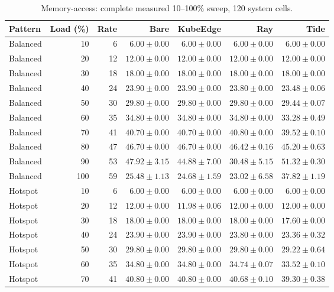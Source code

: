 \begin{table}[htbp]\centering\small
\caption{Memory-access: complete measured 10--100\% sweep, 120 system cells.}
\label{tab:fig6-sweep-memory}
\begin{tabular*}{\linewidth}{@{\extracolsep{\fill}}lrrrrrr}
\toprule Pattern & Load (\%) & Rate & Bare & KubeEdge & Ray & Tide\\\midrule
Balanced & 10 & 6 & $6.00 \pm 0.00$ & $6.00 \pm 0.00$ & $6.00 \pm 0.00$ & $6.00 \pm 0.00$\\
Balanced & 20 & 12 & $12.00 \pm 0.00$ & $12.00 \pm 0.00$ & $12.00 \pm 0.00$ & $12.00 \pm 0.00$\\
Balanced & 30 & 18 & $18.00 \pm 0.00$ & $18.00 \pm 0.00$ & $18.00 \pm 0.00$ & $18.00 \pm 0.00$\\
Balanced & 40 & 24 & $23.90 \pm 0.00$ & $23.90 \pm 0.00$ & $23.80 \pm 0.00$ & $23.48 \pm 0.06$\\
Balanced & 50 & 30 & $29.80 \pm 0.00$ & $29.80 \pm 0.00$ & $29.80 \pm 0.00$ & $29.44 \pm 0.07$\\
Balanced & 60 & 35 & $34.80 \pm 0.00$ & $34.80 \pm 0.00$ & $34.80 \pm 0.00$ & $33.28 \pm 0.49$\\
Balanced & 70 & 41 & $40.70 \pm 0.00$ & $40.70 \pm 0.00$ & $40.80 \pm 0.00$ & $39.52 \pm 0.10$\\
Balanced & 80 & 47 & $46.70 \pm 0.00$ & $46.70 \pm 0.00$ & $46.42 \pm 0.16$ & $45.20 \pm 0.63$\\
Balanced & 90 & 53 & $47.92 \pm 3.15$ & $44.88 \pm 7.00$ & $30.48 \pm 5.15$ & $51.32 \pm 0.30$\\
Balanced & 100 & 59 & $25.48 \pm 1.13$ & $24.68 \pm 1.59$ & $23.02 \pm 6.58$ & $37.82 \pm 1.19$\\
\midrule
Hotspot & 10 & 6 & $6.00 \pm 0.00$ & $6.00 \pm 0.00$ & $6.00 \pm 0.00$ & $6.00 \pm 0.00$\\
Hotspot & 20 & 12 & $12.00 \pm 0.00$ & $11.98 \pm 0.06$ & $12.00 \pm 0.00$ & $12.00 \pm 0.00$\\
Hotspot & 30 & 18 & $18.00 \pm 0.00$ & $18.00 \pm 0.00$ & $18.00 \pm 0.00$ & $17.60 \pm 0.00$\\
Hotspot & 40 & 24 & $23.90 \pm 0.00$ & $23.90 \pm 0.00$ & $23.80 \pm 0.00$ & $23.36 \pm 0.32$\\
Hotspot & 50 & 30 & $29.80 \pm 0.00$ & $29.80 \pm 0.00$ & $29.80 \pm 0.00$ & $29.22 \pm 0.64$\\
Hotspot & 60 & 35 & $34.80 \pm 0.00$ & $34.80 \pm 0.00$ & $34.74 \pm 0.07$ & $33.52 \pm 0.10$\\
Hotspot & 70 & 41 & $40.80 \pm 0.00$ & $40.80 \pm 0.00$ & $40.68 \pm 0.10$ & $39.30 \pm 0.38$\\

\end{tabular*}
\end{table}
